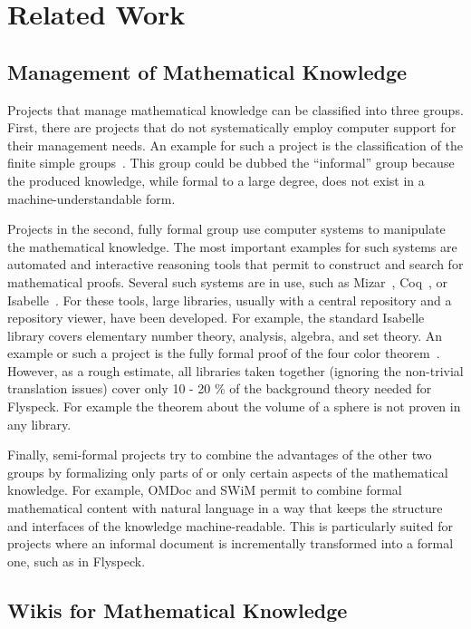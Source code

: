 \section{Related Work}
\label{sec:related}


\subsection{Management of Mathematical Knowledge}
\label{sec:mkm}

Projects that manage mathematical knowledge can be classified into three groups.  First, there are projects that do not systematically employ computer support for their management needs.  An example for such a project is the classification of the finite simple groups~\cite{Gorenstein-Lyons-Salomon:1994}.  This group could be dubbed the ``informal'' group because the produced knowledge, while formal to a large degree, does not exist in a machine-understandable form.

Projects in the second, fully formal group use computer systems to manipulate the mathematical knowledge.  The most important examples for such systems are automated and interactive reasoning tools that permit to construct and search for mathematical proofs. Several such systems are in use, such as Mizar~\cite{mizarmanual}, Coq~\cite{Coq}, or Isabelle~\cite{Isabelle}.  For these tools, large libraries, usually with a central repository and a repository viewer, have been developed.  For example, the standard Isabelle library covers elementary number theory, analysis, algebra, and set theory. An example or such a project is the fully formal proof of the four color theorem~\cite{Gonthier:FourColor}. However, as a rough estimate, all libraries taken together (ignoring the non-trivial translation issues) cover only 10 - 20 \% of the background theory needed for Flyspeck. For example the theorem about the volume of a sphere is not proven in any library.

Finally, semi-formal projects try to combine the advantages of the other two groups by formalizing only parts of or only certain aspects of the mathematical knowledge.  For example, OMDoc and SWiM permit to combine formal mathematical content with natural language in a way that keeps the structure and interfaces of the knowledge machine-readable.  This is particularly suited for projects where an informal document is incrementally transformed into a formal one, such as in Flyspeck.

\subsection{Wikis for Mathematical Knowledge}
\label{sec:math-wiki}

